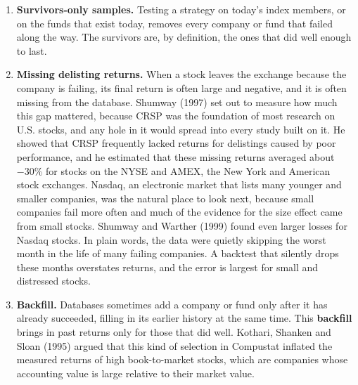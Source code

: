 \begin{enumerate}
  \item \textbf{Survivors-only samples.} Testing a strategy on today's index members, or on the funds that exist today, removes every company or fund that failed along the way. The survivors are, by definition, the ones that did well enough to last.
  \item \textbf{Missing delisting returns.} When a stock leaves the exchange because the company is failing, its final return is often large and negative, and it is often missing from the database. Shumway (1997) set out to measure how much this gap mattered, because CRSP was the foundation of most research on U.S. stocks, and any hole in it would spread into every study built on it. He showed that CRSP frequently lacked returns for delistings caused by poor performance, and he estimated that these missing returns averaged about $-30$\% for stocks on the NYSE and AMEX, the New York and American stock exchanges. Nasdaq, an electronic market that lists many younger and smaller companies, was the natural place to look next, because small companies fail more often and much of the evidence for the size effect came from small stocks. Shumway and Warther (1999) found even larger losses for Nasdaq stocks. In plain words, the data were quietly skipping the worst month in the life of many failing companies. A backtest that silently drops these months overstates returns, and the error is largest for small and distressed stocks.
  \item \textbf{Backfill.} Databases sometimes add a company or fund only after it has already succeeded, filling in its earlier history at the same time. This \textbf{backfill} brings in past returns only for those that did well. Kothari, Shanken and Sloan (1995) argued that this kind of selection in Compustat inflated the measured returns of high book-to-market stocks, which are companies whose accounting value is large relative to their market value.
\end{enumerate}

